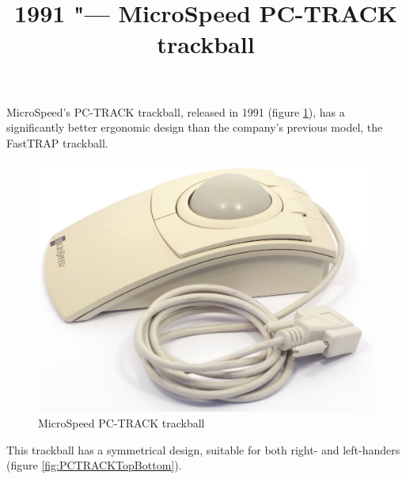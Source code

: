 \documentclass[11pt, a4paper]{article}
\begin{document}
\title{1991 "--- MicroSpeed PC-TRACK trackball}
\date{}
\maketitle
{}
MicroSpeed's PC-TRACK trackball, released in 1991 (figure \ref{fig:PCTRACKPic}), has a significantly better ergonomic design than the company's previous model, the FastTRAP trackball.

\begin{figure}[h]
    \centering
    \includegraphics[scale=0.4]{1991_microspeed_pc-track/pic_30.jpg}
    \caption{MicroSpeed PC-TRACK trackball}
    \label{fig:PCTRACKPic}
\end{figure}

This trackball has a symmetrical design, suitable for both right- and left-handers (figure \ref{fig:PCTRACKTopBottom}). 
\end{document}
